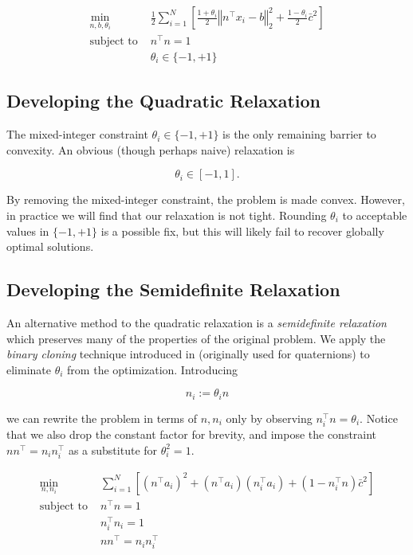 \documentclass[conference]{IEEEtran}
\begin{document}
\begin{align}
	\min_{n, b, \theta_i} \; & \frac12 \sum_{i = 1}^N \left[ \frac{1+\theta_i}{2} \left\Vert n^\top x_i - b \right\Vert_2^2 + \frac{1-\theta_i}{2} \bar{c}^2 \right] \\
	\text{subject to } & n^\top n = 1 \\
	& \theta_i \in \{ -1, +1 \}
\end{align}

\subsection{Developing the Quadratic Relaxation}

The mixed-integer constraint \( \theta_i \in \{ -1, +1 \} \) is the only remaining barrier to convexity.  An obvious (though perhaps naive) relaxation is

\begin{equation*}
	\theta_i \in [-1, 1].
\end{equation*}

By removing the mixed-integer constraint, the problem is made convex.  However, in practice we will find that our relaxation is not tight.  Rounding \( \theta_i \) to acceptable values in \( \{ -1, +1 \} \) is a possible fix, but this will likely fail to recover globally optimal solutions.

\subsection{Developing the Semidefinite Relaxation}

An alternative method to the quadratic relaxation is a \textit{semidefinite relaxation} which preserves many of the properties of the original problem.  We apply the \textit{binary cloning} technique introduced in \cite{quasar} (originally used for quaternions) to eliminate \( \theta_i \) from the optimization.  Introducing

\begin{equation}
	n_i := \theta_i n
\end{equation}

we can rewrite the problem in terms of \( n, n_i \) only by observing \( n_i^\top n = \theta_i \).  Notice that we also drop the constant factor for brevity, and impose the constraint \( n n^\top = n_i n_i^\top \) as a substitute for \( \theta_i^2 = 1 \).

\begin{align}
	\min_{n, n_i} \; & \sum_{i = 1}^N \left[ (n^\top a_i)^2 + (n^\top a_i)(n_i^\top a_i) + (1 - n_i^\top n) \bar{c}^2 \right] \\
	\text{subject to } & n^\top n = 1 \\
	& n_i^\top n_i = 1 \\
	& n n^\top = n_i n_i^\top
\end{align}
\end{document}
